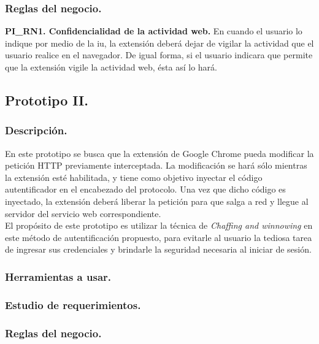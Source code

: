 \documentclass[12pt, a4paper, titlepage]{article}
\begin{document}
			\subsubsection{Reglas del negocio.}
				{\setlength{\parindent}{12pt}
				\label{PI_RN1}
				\textbf{PI\_RN1. Confidencialidad de la actividad web.} En cuando el usuario lo indique por medio de la \acrlong{iu}, la extensión deberá dejar de vigilar la actividad que el usuario realice en el navegador. De igual forma, si el usuario indicara que permite que la extensión vigile la actividad web, ésta así lo hará.\\
				}\newpage
				
		
		\subsection{Prototipo II.}
		    \subsubsection{Descripción.}
		    En este prototipo se busca que la extensión de Google Chrome pueda modificar la petición HTTP previamente interceptada. La modificación se hará sólo mientras la extensión esté habilitada, y tiene como objetivo inyectar el código autentificador en el encabezado del protocolo. Una vez que dicho código es inyectado, la extensión deberá liberar la petición para que salga a red y llegue al servidor del servicio web correspondiente.\\
		    
		    El propósito de este prototipo es utilizar la técnica de \textit{Chaffing and winnowing} en este método de autentificación propuesto, para evitarle al usuario la tediosa tarea de ingresar sus credenciales y brindarle la seguridad necesaria al iniciar de sesión.
		    
		    \subsubsection{Herramientas a usar.}
		    \subsubsection{Estudio de requerimientos.}
		    \subsubsection{Reglas del negocio.}
	\newpage
	
\end{document}
